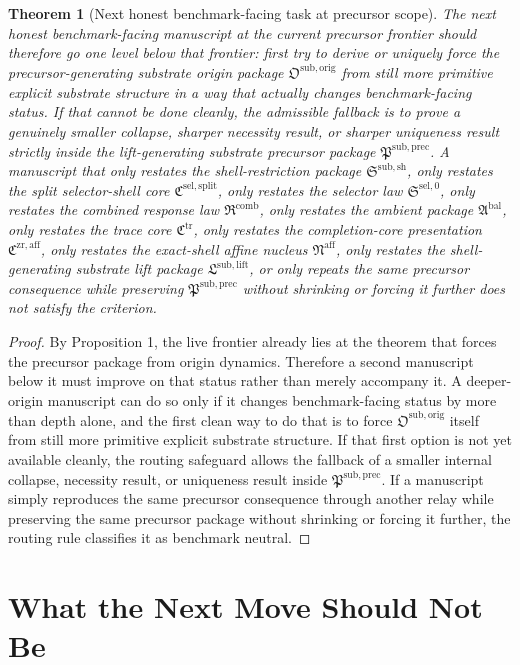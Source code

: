 \documentclass[11pt]{article}
\newcommand{\CompletionCore}{\mathfrak C^{\mathrm{zr,aff}}}
\newcommand{\TraceCore}{\mathfrak C^{\mathrm{tr}}}
\newcommand{\AffineNucleus}{\mathfrak N^{\mathrm{aff}}}
\newcommand{\AmbientPackage}{\mathfrak A^{\mathrm{bal}}}
\newcommand{\CombinedLaw}{\mathfrak R^{\mathrm{comb}}}
\newcommand{\SelectorLaw}{\mathfrak S^{\mathrm{sel},0}}
\newcommand{\SelectorCore}{\mathfrak C^{\mathrm{sel,split}}}
\newcommand{\ShellRestriction}{\mathfrak S^{\mathrm{sub,sh}}}
\newcommand{\LiftPackage}{\mathfrak L^{\mathrm{sub,lift}}}
\newcommand{\PrecursorPackage}{\mathfrak P^{\mathrm{sub,prec}}}
\newcommand{\OriginPackage}{\mathfrak O^{\mathrm{sub,orig}}}
\newtheorem{theorem}{Theorem}
\begin{document}
\begin{theorem}[Next honest benchmark-facing task at precursor scope]
The next honest benchmark-facing manuscript at the current precursor frontier should therefore go one level below that frontier: first try to derive or uniquely force the precursor-generating substrate origin package \(\OriginPackage\) from still more primitive explicit substrate structure in a way that actually changes benchmark-facing status. If that cannot be done cleanly, the admissible fallback is to prove a genuinely smaller collapse, sharper necessity result, or sharper uniqueness result strictly inside the lift-generating substrate precursor package \(\PrecursorPackage\). A manuscript that only restates the shell-restriction package \(\ShellRestriction\), only restates the split selector-shell core \(\SelectorCore\), only restates the selector law \(\SelectorLaw\), only restates the combined response law \(\CombinedLaw\), only restates the ambient package \(\AmbientPackage\), only restates the trace core \(\TraceCore\), only restates the completion-core presentation \(\CompletionCore\), only restates the exact-shell affine nucleus \(\AffineNucleus\), only restates the shell-generating substrate lift package \(\LiftPackage\), or only repeats the same precursor consequence while preserving \(\PrecursorPackage\) without shrinking or forcing it further does not satisfy the criterion.
\end{theorem}

\begin{proof}
By Proposition 1, the live frontier already lies at the theorem that forces the precursor package from origin dynamics. Therefore a second manuscript below it must improve on that status rather than merely accompany it. A deeper-origin manuscript can do so only if it changes benchmark-facing status by more than depth alone, and the first clean way to do that is to force \(\OriginPackage\) itself from still more primitive explicit substrate structure. If that first option is not yet available cleanly, the routing safeguard allows the fallback of a smaller internal collapse, necessity result, or uniqueness result inside \(\PrecursorPackage\). If a manuscript simply reproduces the same precursor consequence through another relay while preserving the same precursor package without shrinking or forcing it further, the routing rule classifies it as benchmark neutral.
\end{proof}

\section{What the Next Move Should Not Be}
\end{document}
